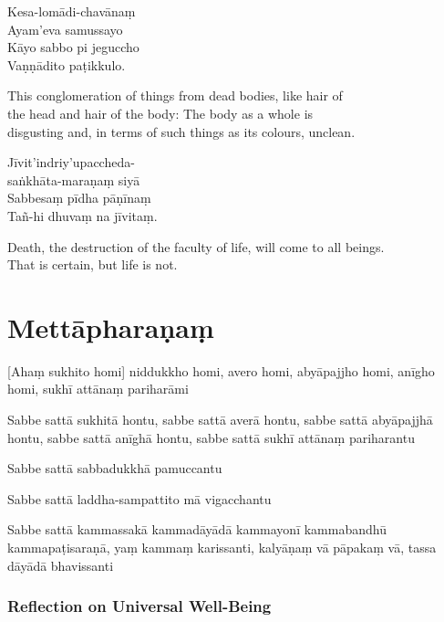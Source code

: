 Kesa-lomādi-chavānaṃ\\
Ayam'eva samussayo\\
Kāyo sabbo pi jeguccho\\
Vaṇṇādito paṭikkulo.

\begin{english}
  This conglomeration of things from dead bodies, like hair of\\
  the head and hair of the body: The body as a whole is\\
  disgusting and, in terms of such things as its colours, unclean.
\end{english}

Jīvit'indriy'upaccheda-\\
saṅkhāta-maraṇaṃ siyā\\
Sabbesaṃ pīdha pāṇīnaṃ\\
Tañ-hi dhuvaṃ na jīvitaṃ.

\begin{english}
  Death, the destruction of the faculty of life, will come to all beings.\\
  That is certain, but life is not.
\end{english}

\section{Mettāpharaṇaṃ}

\begin{leader}
\end{leader}


[Ahaṃ sukhito homi] niddukkho homi, avero homi, abyāpajjho homi, anīgho homi,
sukhī attānaṃ pariharāmi

Sabbe sattā sukhitā hontu, sabbe sattā averā hontu, sabbe sattā abyāpajjhā
hontu, sabbe sattā anīghā hontu, sabbe sattā sukhī attānaṃ pariharantu

Sabbe sattā sabbadukkhā pamuccantu

Sabbe sattā laddha-sampattito mā vigacchantu

Sabbe sattā kammassakā kammadāyādā kammayonī kammabandhū kammapaṭisaraṇā,
yaṃ kammaṃ karissanti, kalyāṇaṃ vā pāpakaṃ vā, tassa dāyādā bhavissanti


\subsubsection{Reflection on Universal Well-Being}

